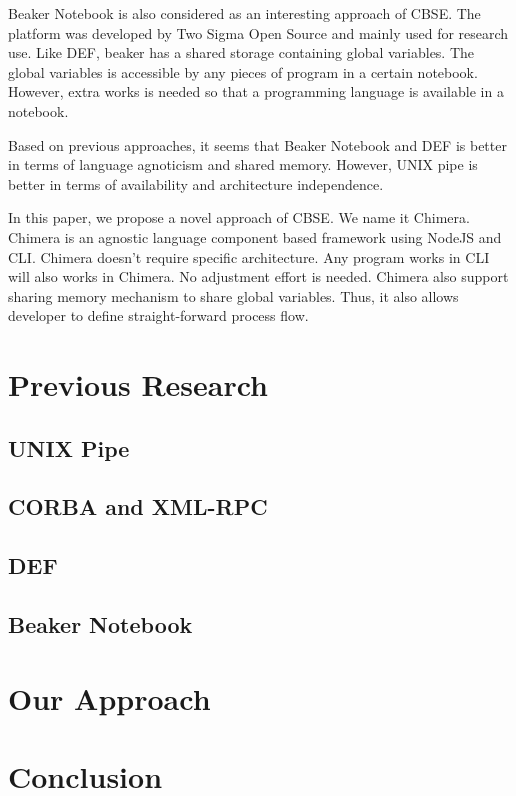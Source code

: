 \documentclass[conference]{IEEEtran}
\begin{document}
Beaker Notebook \cite{beakernotebook} is also considered as an interesting approach of CBSE. The platform was developed by Two Sigma Open Source and mainly used for research use. Like DEF, beaker has a shared storage containing global variables. The global variables is accessible by any pieces of program in a certain notebook. However, extra works is needed so that a programming language is available in a notebook.

Based on previous approaches, it seems that Beaker Notebook and DEF is better in terms of language agnoticism and shared memory. However, UNIX pipe is better in terms of availability and architecture independence.

In this paper, we propose a novel approach of CBSE. We name it Chimera. Chimera is an agnostic language component based framework using NodeJS and CLI. Chimera doesn't require specific architecture. Any program works in CLI will also works in Chimera. No adjustment effort is needed. Chimera also support sharing memory mechanism to share global variables. Thus, it also allows developer to define straight-forward process flow.


\section{Previous Research}

\subsection{UNIX Pipe}

\subsection{CORBA and XML-RPC}

\subsection{DEF}

\subsection{Beaker Notebook}

\section{Our Approach}

\section{Conclusion}
\end{document}
